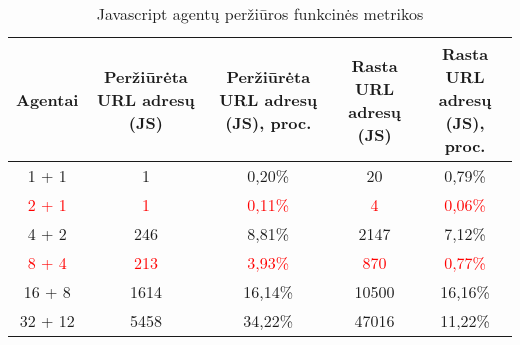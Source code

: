 \begin{table}[htbp]
  \centering
  \caption{Javascript agentų peržiūros funkcinės metrikos}
    \begin{tabular}{|c|c|c|c|c|}
    \toprule
    \textbf{Agentai} & \multicolumn{1}{p{7em}|}{\textbf{ Peržiūrėta URL adresų (JS)}} & \multicolumn{1}{p{7.61em}|}{\textbf{ Peržiūrėta URL adresų (JS), proc.}} & \multicolumn{1}{p{8.11em}|}{\textbf{Rasta URL adresų (JS)}} & \multicolumn{1}{p{6.78em}|}{\textbf{Rasta URL adresų (JS), proc.}} \\
    \midrule
    1 + 1 & 1     & 0,20\% & 20    & 0,79\% \\
    \midrule
    \textcolor{red}{2 + 1} & \textcolor{red}{1}     & \textcolor{red}{0,11\%} & \textcolor{red}{4}     & \textcolor{red}{0,06\%} \\
    \midrule
    4 + 2 & 246   & 8,81\% & 2147  & 7,12\% \\
    \midrule
    \textcolor{red}{8 + 4} & \textcolor{red}{213}   & \textcolor{red}{3,93\%} & \textcolor{red}{870}   & \textcolor{red}{0,77\%} \\
    \midrule
    16 + 8 & 1614  & 16,14\% & 10500 & 16,16\% \\
    \midrule
    32 + 12 & 5458  & 34,22\% & 47016 & 11,22\% \\
    \bottomrule
    \end{tabular}%
  \label{tab:js_crawling_metrics}%
\end{table}%
